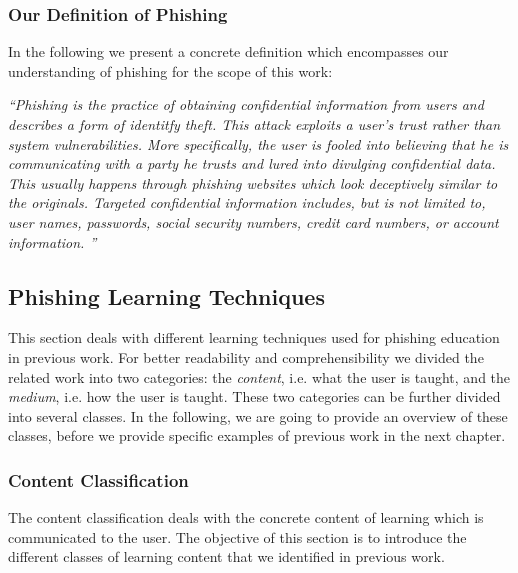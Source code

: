 \subsubsection{Our Definition of Phishing}
In the following we present a concrete definition which encompasses our understanding of phishing for the scope of this work:

\begin{center}
\textit{``Phishing is the practice of obtaining confidential information from users and describes a form of identitfy theft. This attack exploits a user's trust rather than system vulnerabilities. More specifically, the user is fooled into believing that he is communicating with a party he trusts and lured into divulging confidential data. This usually happens through phishing websites which look deceptively similar to the originals. Targeted confidential information includes, but is not limited to, user names, passwords, social security numbers, credit card numbers, or account information.
''}~\cite{jakobsson2006phishing}
\end{center}

\subsection{Phishing Learning Techniques}

This section deals with different learning techniques used for phishing education in previous work.
 For better readability and comprehensibility we divided the related work into two categories: the \textit{content}, i.e.
 what the user is taught, and the 
\textit{medium}, i.e. how the user is taught.
These two categories can be further divided into several classes. 
In the following, we are going to provide an overview of these classes, before we provide specific examples of previous work in the next chapter.


\subsubsection{Content Classification}
\label{s:content_classification}
The content classification deals with the concrete content of learning which is communicated to the user. 
The objective of this section is to introduce the different classes of learning content that we identified in previous work.

